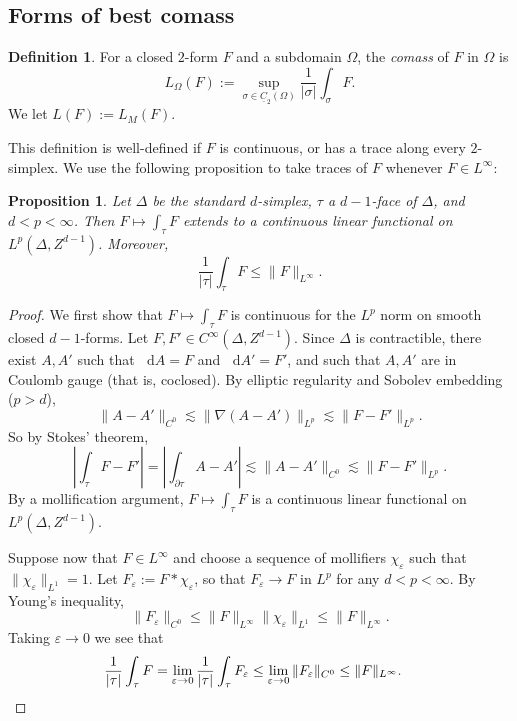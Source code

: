 \documentclass[reqno,11pt]{amsart}
\newcommand*\dif{\mathop{}\!\mathrm{d}}
\newcommand{\Chain}{\underline C}
\newcommand{\dfn}[1]{\emph{#1}\index{#1}}
\newtheorem{proposition}[theorem]{Proposition}
\theoremstyle{definition}
\newtheorem{definition}[theorem]{Definition}
\numberwithin{equation}{section}
\begin{document}
\subsection{Forms of best comass}
\begin{definition}
For a closed $2$-form $F$ and a subdomain $\Omega$, the \dfn{comass} of $F$ in $\Omega$ is
$$L_\Omega(F) := \sup_{\sigma \in \Chain_2(\Omega)} \frac{1}{|\sigma|} \int_\sigma F.$$
We let $L(F) := L_M(F)$.
\end{definition}

This definition is well-defined if $F$ is continuous, or has a trace along every $2$-simplex.
We use the following proposition to take traces of $F$ whenever $F \in L^\infty$:

\begin{proposition}
Let $\Delta$ be the standard $d$-simplex, $\tau$ a $d-1$-face of $\Delta$, and $d < p < \infty$.
Then $F \mapsto \int_\tau F$ extends to a continuous linear functional on $L^p(\Delta, Z^{d - 1})$.
Moreover,
\begin{equation}\label{integral over chain is linfinity}
	\frac{1}{|\tau|} \int_\tau F \leq \|F\|_{L^\infty}.
\end{equation}
\end{proposition}
\begin{proof}
We first show that $F \mapsto \int_\tau F$ is continuous for the $L^p$ norm on smooth closed $d-1$-forms.
Let $F, F' \in C^\infty(\Delta, Z^{d - 1})$.
Since $\Delta$ is contractible, there exist $A, A'$ such that $\dif A = F$ and $\dif A' = F'$, and such that $A, A'$ are in Coulomb gauge (that is, coclosed).
By elliptic regularity and Sobolev embedding ($p > d$),
$$\|A - A'\|_{C^0} \lesssim \|\nabla(A - A')\|_{L^p} \lesssim \|F - F'\|_{L^p}.$$
So by Stokes' theorem,
$$\left|\int_\tau F - F'\right| = \left|\int_{\partial \tau} A - A'\right| \lesssim \|A - A'\|_{C^0} \lesssim \|F - F'\|_{L^p}.$$
By a mollification argument, $F \mapsto \int_\tau F$ is a continuous linear functional on $L^p(\Delta, Z^{d - 1})$.

Suppose now that $F \in L^\infty$ and choose a sequence of mollifiers $\chi_\varepsilon$ such that $\|\chi_\varepsilon\|_{L^1} = 1$.
Let $F_\varepsilon := F * \chi_\varepsilon$, so that $F_\varepsilon \to F$ in $L^p$ for any $d < p < \infty$.
By Young's inequality, 
$$\|F_\varepsilon\|_{C^0} \leq \|F\|_{L^\infty} \|\chi_\varepsilon\|_{L^1} \leq \|F\|_{L^\infty}.$$
Taking $\varepsilon \to 0$ we see that
\begin{align*}
\frac{1}{|\tau|} \int_\tau F 
&= \lim_{\varepsilon \to 0} \frac{1}{|\tau|} \int_\tau F_\varepsilon \leq \lim_{\varepsilon \to 0} \|F_\varepsilon\|_{C^0} \leq \|F\|_{L^\infty}. \qedhere
\end{align*}
\end{proof}
\end{document}

